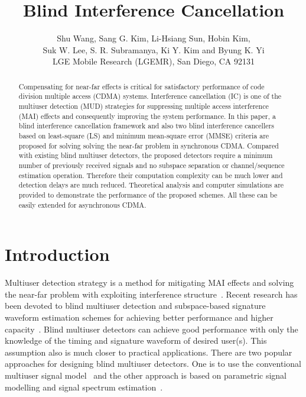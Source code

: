 \documentclass[a4paper,10pt,fleqn, twocolumn]{IEEETran}
\title{Blind Interference Cancellation}
\author{Shu Wang, Sang G. Kim, Li-Hsiang Sun, Hobin Kim,\\
   Suk W. Lee, S. R. Subramanya, Ki Y. Kim and Byung K. Yi\\ LGE Mobile Research (LGEMR), San Diego, CA 92131}
\date{}
\begin{document}
\maketitle
\begin{abstract}\small
Compensating for near-far effects is critical for satisfactory
performance of code division multiple access (CDMA) systems.
Interference cancellation (IC) is one of the multiuser detection
(MUD) strategies for suppressing multiple access interference
(MAI) effects and consequently improving the system performance.
In this paper, a blind interference cancellation framework and
also two blind interference cancellers based on least-square (LS)
and minimum mean-square error (MMSE) criteria are proposed for
solving solving the near-far problem in synchronous CDMA. Compared
with existing blind multiuser detectors, the proposed detectors
require a minimum number of previously received signals and no
subspace separation or channel/sequence estimation operation.
Therefore their computation complexity can be much lower and
detection delays are much reduced. Theoretical analysis and
computer simulations are provided to demonstrate the performance
of the proposed schemes. All these can be easily extended for
asynchronous CDMA.
\end{abstract}
\section{Introduction}
Multiuser detection strategy is a method for mitigating MAI
effects and solving the near-far problem with exploiting
interference structure~\cite{Verd98}. Recent research has been
devoted to blind multiuser detection and subspace-based signature
waveform estimation schemes for achieving better performance and
higher capacity~\cite{Madh94,Honi95,Torl97,Wang98,Wang99,Zhang02}.
Blind multiuser detectors can achieve good performance with only
the knowledge of the timing and signature waveform of desired
user(s). This assumption also is much closer to practical
applications. There are two popular approaches for designing blind
multiuser detectors. One is to use the conventional multiuser
signal model~\cite{Verd98,Madh94,Honi95,Zhang02} and the other
approach is based on parametric signal modelling and signal
spectrum estimation~\cite{Wang98,Wang99}.
\end{document}
